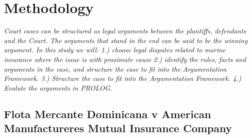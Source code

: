 \setlength{\footskip}{8mm}

\chapter{Methodology}
\label{ch:methodology}

\textit{Court cases can be structured as legal arguments between the plantiffs, defendants and the Court. The arguments that stand in the end can be said to be the winning argument.
In this study we will:  1.) choose legal disputes related to marine insurance where the issue is with proximate cause  2.) identify the rules, facts and arguments in the case, and structure the case to fit into the Argumentation Framework. 3.) Structure the case to fit into the Argumentation Framework. 4.) Evalute the arguments in PROLOG.}

\section{Flota Mercante Dominicana v American Manufactureres Mutual Insurance Company}

\newcommand{\factOne}{Plaintiff was the owner of the SS SANTO DOMINGO which burned and sank in the harbor of Santo Domingo, Dominican Republic, following shelling by members of the U.S. Armed Forces on May 4 and 5, 1965.}

\newcommand{\factTwo}{On April 24, 1965, the vessel cleared New York bound for Santo Domingo. The same day the news of the uprising in the Dominican Republic reached the ship}

\newcommand{\factThree}{According to the testimony of the ship’s captain, the broadcasts were greeted with nervous excitement by the crew. There was considerable drinking of alcoholic beverages, much hanging about the radio operator’s quarters and a general loosening of the crew’s discipline. A couple of days out of Santo Domingo, a deputation led by the first cook waited on the captain and persuaded him to permit transmission of a message sympathetic to the new constitution.}

\newcommand{\factFour}{On approaching the harbor of Santo Domingo, the captain held a meeting of the officers to discuss the question of putting into the harbor. The captain’s orders on leaving New York were to proceed to Santo Domingo, and he had received no change in those orders. He had had previous experience with navigating during revolutions, coups and uprisings in the Dominican Republic, none of which had resulted in seriously damaging consequences. Moreover, the atmosphere on ship was tense (the captain slept with a hand gun beneath his pillow), and the crew had made it clear by their behavior that they wished to enter Santo Domingo. In these circumstances, it was decided to enter the port.}

